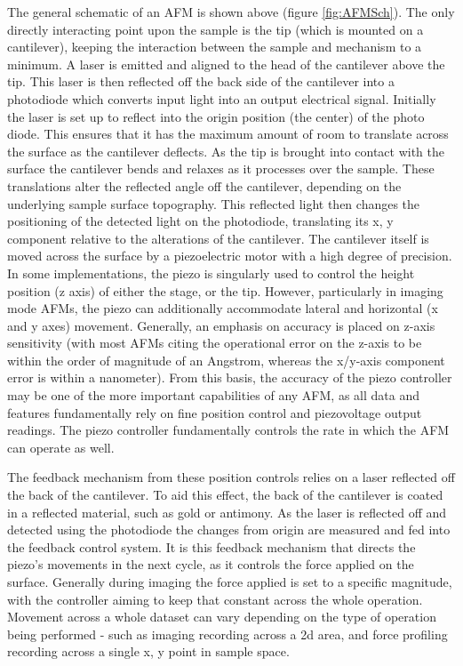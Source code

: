 The general schematic of an AFM is shown above (figure \ref{fig:AFMSch}). The only directly interacting point upon the sample is the tip (which is mounted on a cantilever), keeping the interaction between the sample and mechanism to a minimum. A laser is emitted and aligned to the head of the cantilever above the tip. This laser is then reflected off the back side of the cantilever into a photodiode which converts input light into an output electrical signal. Initially the laser is set up to reflect into the origin position (the center) of the photo diode. This ensures that it has the maximum amount of room to translate across the surface as the cantilever deflects. As the tip is brought into contact with the surface the cantilever bends and relaxes as it processes over the sample. These translations alter the reflected angle off the cantilever, depending on the underlying sample surface topography. This reflected light then changes the positioning of the detected light on the photodiode, translating its x, y component relative to the alterations of the cantilever. The cantilever itself is moved across the surface by a piezoelectric motor with a high degree of precision. In some implementations, the piezo is singularly used to control the height position (z axis) of either the stage, or the tip. However, particularly in imaging mode AFMs, the piezo can additionally accommodate lateral and horizontal (x and y axes) movement. Generally, an emphasis on accuracy is placed on z-axis sensitivity (with most AFMs citing the operational error on the z-axis to be within the order of magnitude of an Angstrom, whereas the x/y-axis component error is within a nanometer). From this basis, the accuracy of the piezo controller may be one of the more important capabilities of any AFM, as all data and features fundamentally rely on fine position control and piezovoltage output readings. The piezo controller fundamentally controls the rate in which the AFM can operate as well. 

The feedback mechanism from these position controls relies on a laser reflected off the back of the cantilever. To aid this effect, the back of the cantilever is coated in a reflected material, such as gold or antimony. As the laser is reflected off and detected using the photodiode the changes from origin are measured and fed into the feedback control system. It is this feedback mechanism that directs the piezo's movements in the next cycle, as it controls the force applied on the surface. Generally during imaging the force applied is set to a specific magnitude, with the controller aiming to keep that constant across the whole operation. Movement across a whole dataset can vary depending on the type of operation being performed - such as imaging recording across a 2d area, and force profiling recording across a single x, y point in sample space.

